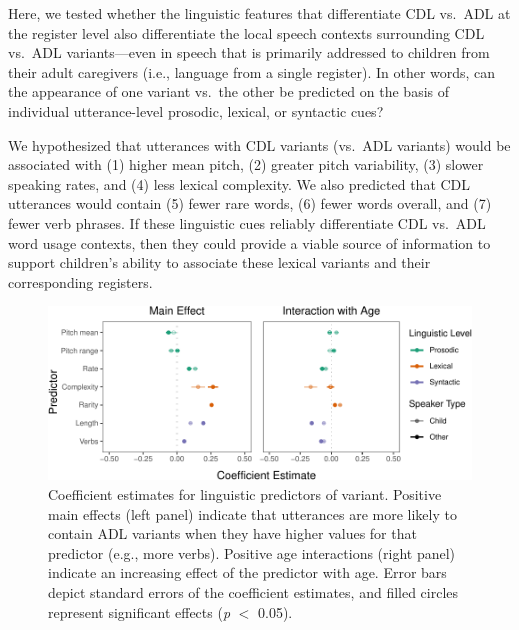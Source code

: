 \documentclass[10pt, letterpaper]{article}
\newenvironment{CodeChunk}{}{}
\begin{document}
Here, we tested whether the linguistic features that differentiate CDL
vs.~ADL at the register level also differentiate the local speech
contexts surrounding CDL vs.~ADL variants---even in speech that is
primarily addressed to children from their adult caregivers (i.e.,
language from a single register). In other words, can the appearance of
one variant vs.~the other be predicted on the basis of individual
utterance-level prosodic, lexical, or syntactic cues?

We hypothesized that utterances with CDL variants (vs.~ADL variants)
would be associated with (1) higher mean pitch, (2) greater pitch
variability, (3) slower speaking rates, and (4) less lexical complexity.
We also predicted that CDL utterances would contain (5) fewer rare
words, (6) fewer words overall, and (7) fewer verb phrases. If these
linguistic cues reliably differentiate CDL vs.~ADL word usage contexts,
then they could provide a viable source of information to support
children's ability to associate these lexical variants and their
corresponding registers.

\begin{CodeChunk}
\begin{figure}[h]

{\centering \includegraphics{figs/ling-predictors-fig-1} 

}

\caption[Coefficient estimates for linguistic predictors of variant]{Coefficient estimates for linguistic predictors of variant. Positive main effects (left panel) indicate that utterances are more likely to contain ADL variants when they have higher values for that predictor (e.g., more verbs). Positive age interactions (right panel) indicate an increasing effect of the predictor with age. Error bars depict standard errors of the coefficient estimates, and filled circles represent significant effects (\textit{p} $<$ 0.05).}\label{fig:ling-predictors-fig}
\end{figure}
\end{CodeChunk}
\end{document}

